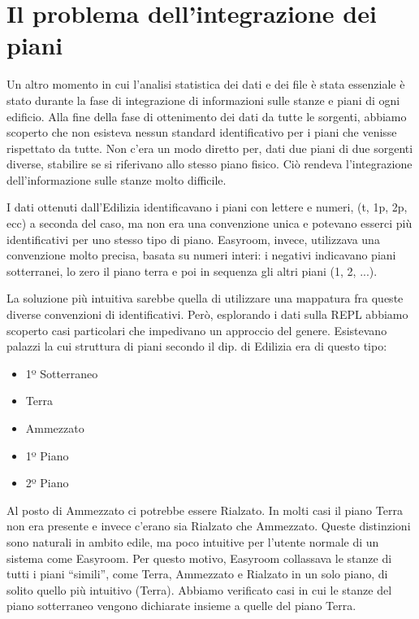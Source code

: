 \documentclass[12pt]{report}
\begin{document}
\section{Il problema dell'integrazione dei piani}

Un altro momento in cui l'analisi statistica dei dati e dei file è
stata essenziale è stato durante la fase di integrazione di informazioni sulle
stanze e piani di ogni edificio. Alla fine della fase di ottenimento dei
dati da tutte le sorgenti, abbiamo scoperto che non esisteva nessun 
standard identificativo per i piani che venisse rispettato da tutte. 
Non c'era un modo diretto per, dati due piani di due sorgenti diverse,
stabilire se si riferivano allo stesso piano fisico. Ciò rendeva 
l'integrazione dell'informazione sulle stanze molto difficile.

I dati ottenuti dall'Edilizia identificavano i piani con lettere e numeri, 
(t, 1p, 2p, ecc) a seconda del caso, ma non era una convenzione unica 
e potevano esserci più identificativi per uno stesso tipo di piano. 
Easyroom, invece, utilizzava una convenzione molto precisa, 
basata su numeri interi: i negativi indicavano piani sotterranei,
lo zero il piano terra e poi in sequenza gli altri piani (1, 2, ...). 

La soluzione più intuitiva sarebbe quella di utilizzare una mappatura fra
queste diverse convenzioni di identificativi. Però, esplorando
i dati sulla REPL abbiamo scoperto casi particolari che impedivano un
approccio del genere. Esistevano palazzi la cui struttura di piani
secondo il dip. di Edilizia era di questo tipo:

\begin{itemize}
	\item 1º Sotterraneo
	\item Terra
	\item Ammezzato
	\item 1º Piano
	\item 2º Piano
\end{itemize}

Al posto di Ammezzato ci potrebbe essere Rialzato. In molti casi
il piano Terra non era presente e invece c'erano sia Rialzato che
Ammezzato. Queste distinzioni sono naturali in ambito edile, ma poco
intuitive per l'utente normale di un sistema come Easyroom. Per questo 
motivo, Easyroom collassava le stanze di tutti i piani ``simili'',
come Terra, Ammezzato e Rialzato in un solo piano, di solito quello
più intuitivo (Terra). Abbiamo verificato casi in cui le stanze del piano 
sotterraneo vengono dichiarate insieme a quelle del piano Terra.
\end{document}
